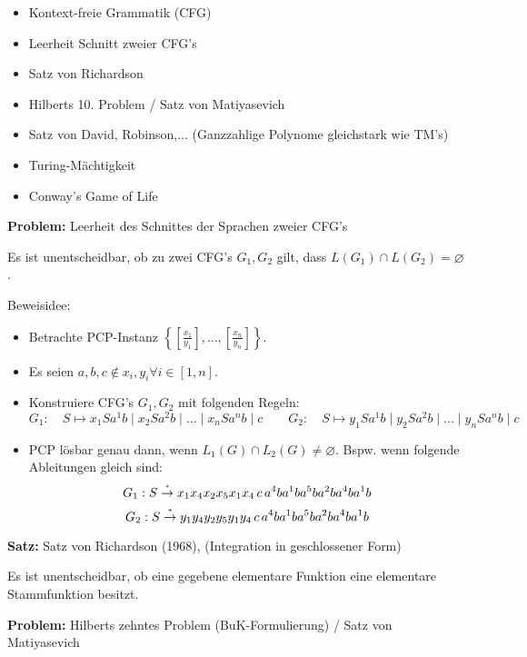 \documentclass[a4paper,graphics,11pt]{article}
\newcommand{\up}[2]{\mathrel{\overset{\makebox[0pt]{\mbox{\normalfont\tiny #2}}}{#1}}}
\begin{document}
\begin{itemize}
    \item Kontext-freie Grammatik (CFG)
    \item Leerheit Schnitt zweier CFG's
    \item Satz von Richardson
    \item Hilberts 10. Problem / Satz von Matiyasevich
    \item Satz von David, Robinson,... (Ganzzahlige Polynome gleichstark wie TM's)
    \item Turing-Mächtigkeit
    \item Conway's Game of Life
\end{itemize}

\textbf{Problem:} Leerheit des Schnittes der Sprachen zweier CFG's

Es ist unentscheidbar, ob zu zwei CFG's $G_1,G_2$ gilt, dass $L(G_1) \cap L(G_2) = \varnothing$.

Beweisidee:
\begin{itemize}
    \item Betrachte PCP-Instanz
        $\displaystyle\left\{\left[\frac{x_1}{y_1}\right],\dots,\left[\frac{x_n}{y_n} \right]\right\}$.\\
    \item Es seien $a,b,c \notin x_i,y_i \forall i \in [1,n]$.
    \item Konstruiere CFG's $G_1,G_2$ mit folgenden Regeln:
        $$
            G_1:\quad S\mapsto x_1Sa^1b \mid x_2 Sa^2b \mid \dots \mid x_n Sa^nb \mid c
            \qquad
            G_2:\quad S\mapsto y_1Sa^1b \mid y_2 Sa^2b \mid \dots \mid y_n Sa^nb \mid c
        $$
    \item PCP lösbar genau dann, wenn $L_1(G) \cap L_2(G) \neq \varnothing$. Bspw.
        wenn folgende Ableitungen gleich sind:
        $$
            G_1 : S \up{\to}{*} x_1x_4x_2x_5x_1x_4\,c\,a^4ba^1ba^5ba^2ba^4ba^1b
        $$$$
            G_2 : S \up{\to}{*} y_1y_4y_2y_5y_1y_4\,c\,a^4ba^1ba^5ba^2ba^4ba^1b
        $$
\end{itemize}

\strut

\textbf{Satz:} Satz von Richardson (1968), (Integration in geschlossener Form)

Es ist unentscheidbar, ob eine gegebene elementare Funktion eine elementare Stammfunktion besitzt.

\strut

\textbf{Problem:} Hilberts zehntes Problem (BuK-Formulierung) / Satz von Matiyasevich
\end{document}
